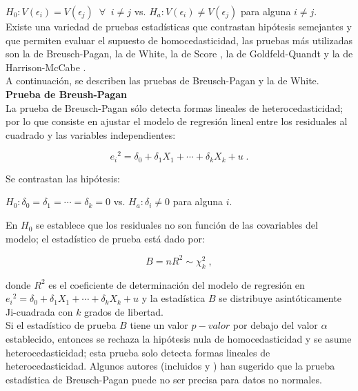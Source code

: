 $H_0: V(\epsilon_i) = V(\epsilon_j) \;\; \forall \;\; i \neq j$   vs.   $H_a: V(\epsilon_i) \neq V(\epsilon_j)$ para alguna $i \neq j$. \\

Existe una variedad de pruebas estadísticas que contrastan hipótesis semejantes y que permiten evaluar el supuesto de homocedasticidad, las pruebas más utilizadas son la de Breusch-Pagan, la de White, la de Score \parencite{taboga-2017}, la de Goldfeld-Quandt \parencite{goldfeld-2024} y la de Harrison-McCabe \parencite{harris-1979} .\\

A continuación, se describen las pruebas de Breusch-Pagan y la de White.\\




\textbf{Prueba de Breush-Pagan} ~\parencites{breush-1979, verbeek-2004}\\

La prueba de Breusch-Pagan sólo detecta formas lineales de heterocedasticidad; por lo que consiste en ajustar el modelo de regresión lineal entre los residuales al cuadrado y las variables independientes:

\begin{center}
	$${e_i} ^2=\delta _0 + \delta _1 X_1+ \cdots + \delta _k X_k  + u \; .$$
\end{center}

Se contrastan las hipótesis:\\

\begin{center}
	$H_0: \delta _0 = \delta _1 = \cdots =\delta _k=0 $  vs.  $H_a: \delta_i \neq 0$ para alguna $i$.
\end{center}


En $H_0$ se establece que los residuales no son función de las covariables del modelo; el estadístico de prueba está dado por:


\begin{center}
	$$B=n R ^2 \sim \chi_k ^2 \; ,$$
\end{center}


donde $R^2$ es el coeficiente de determinación del modelo de regresión en ${e_i} ^2=\delta _0 + \delta _1 X_1+ \cdots + \delta _k X_k  + u$ y la estadística $B$ se distribuye asintóticamente Ji-cuadrada con $k$ grados de libertad.\\

Si el estadístico de prueba $B$ tiene un valor $p-valor$  por debajo del valor $\alpha$ establecido, entonces se rechaza la hipótesis nula de homocedasticidad y se asume heterocedasticidad; esta prueba solo detecta formas lineales de heterocedasticidad. Algunos autores (incluidos \textcite{bickel-1978} y \textcite{koenker-1981}) han sugerido que la prueba estadística de Breusch-Pagan puede no ser precisa para datos no normales.\\


